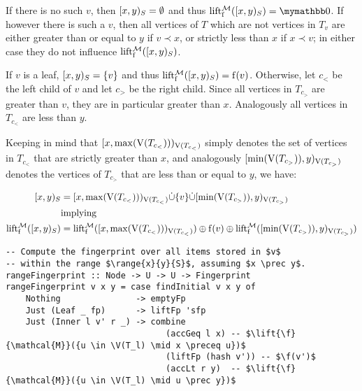 If there is no such $v$, then $[{x},{y})_{S} = \emptyset$ and thus $\lift{\f}{\mathcal{M}}(\range{x}{y}{S}) = \neutraladd$. If however there is such a $v$, then all vertices of $T$ which are not vertices in $T_v$ are either greater than or equal to $y$ if $v \prec x$, or strictly less than $x$ if $x \prec v$; in either case they do not influence $\operatorname{lift_{\operatorname{f}}^{\mathcal{M}}}([{x},{y})_{S})$.

If $v$ is a leaf, $[{x},{y})_{S} = \{v\}$ and thus $\operatorname{lift_{\operatorname{f}}^{\mathcal{M}}}([{x},{y})_{S}) = \operatorname{f}(v)$. Otherwise, let $c_{<}$ be the left child of $v$ and let $c_{>}$ be the right child. Since all vertices in $T_{c_{>}}$ are greater than $v$, they are in particular greater than $x$. Analogously all vertices in $T_{c_{<}}$ are less than $y$.

Keeping in mind that $[{x},{\max(\operatorname{V}(T_{c_{<}}))})_{\operatorname{V}(T_{c_{<}})}$ simply denotes the set of vertices in $T_{c_{<}}$ that are strictly greater than $x$, and analogously $[{\min(\operatorname{V}(T_{c_{>}}))},{y})_{\operatorname{V}(T_{c_{>}})}$ denotes the vertices of $T_{c_{>}}$ that are less than or equal to $y$, we have:

\begin{align*}
[{x},{y})_{S} &= {[{x},{\max(\operatorname{V}(T_{c_{<}}))})_{\operatorname{V}(T_{c_{<}})}} \dot{\cup} {{\{v\}} \dot{\cup} {[{\min(\operatorname{V}(T_{c_{>}}))},{y})_{\operatorname{V}(T_{c_{>}})}}}\\
&\mathrm{implying}\\
\operatorname{lift_{\operatorname{f}}^{\mathcal{M}}}([{x},{y})_{S}) &= {\operatorname{lift_{\operatorname{f}}^{\mathcal{M}}}([{x},{\max(\operatorname{V}(T_{c_{<}}))})_{\operatorname{V}(T_{c_{<}})})} \oplus {{\operatorname{f}(v)} \oplus{\operatorname{lift_{\operatorname{f}}^{\mathcal{M}}}([{\min(\operatorname{V}(T_{c_{>}}))},{y})_{\operatorname{V}(T_{c_{>}})})}}\\
\end{align*}

\begin{verbatim}
-- Compute the fingerprint over all items stored in $v$
-- within the range $\range{x}{y}{S}$, assuming $x \prec y$.
rangeFingerprint :: Node -> U -> U -> Fingerprint
rangeFingerprint v x y = case findInitial v x y of
    Nothing               -> emptyFp
    Just (Leaf _ fp)      -> liftFp 'sfp
    Just (Inner l v' r _) -> combine
                                (accGeq l x) -- $\lift{\f}{\mathcal{M}}({u \in \V(T_l) \mid x \preceq u})$
                                (liftFp (hash v')) -- $\f(v')$
                                (accLt r y)  -- $\lift{\f}{\mathcal{M}}({u \in \V(T_l) \mid u \prec y})$
\end{verbatim}

